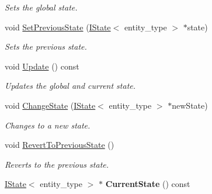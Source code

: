 \begin{DoxyCompactItemize}
\begin{DoxyCompactList}\small\item\em Sets the global state. \end{DoxyCompactList}\item 
\hypertarget{classDCEngine_1_1StateMachine_a5470dc74a0e1430f71854020d97be75c}{void \hyperlink{classDCEngine_1_1StateMachine_a5470dc74a0e1430f71854020d97be75c}{Set\-Previous\-State} (\hyperlink{classDCEngine_1_1IState}{I\-State}$<$ entity\-\_\-type $>$ $\ast$state)}\label{classDCEngine_1_1StateMachine_a5470dc74a0e1430f71854020d97be75c}

\begin{DoxyCompactList}\small\item\em Sets the previous state. \end{DoxyCompactList}\item 
\hypertarget{classDCEngine_1_1StateMachine_abbd522072a86d3a4f2d76f88893d7138}{void \hyperlink{classDCEngine_1_1StateMachine_abbd522072a86d3a4f2d76f88893d7138}{Update} () const }\label{classDCEngine_1_1StateMachine_abbd522072a86d3a4f2d76f88893d7138}

\begin{DoxyCompactList}\small\item\em Updates the global and current state. \end{DoxyCompactList}\item 
void \hyperlink{classDCEngine_1_1StateMachine_ab73e7a9bd5f09f6b6a91eddaad4deb74}{Change\-State} (\hyperlink{classDCEngine_1_1IState}{I\-State}$<$ entity\-\_\-type $>$ $\ast$new\-State)
\begin{DoxyCompactList}\small\item\em Changes to a new state. \end{DoxyCompactList}\item 
\hypertarget{classDCEngine_1_1StateMachine_a5d7c133e380ee786be068543700d52ea}{void \hyperlink{classDCEngine_1_1StateMachine_a5d7c133e380ee786be068543700d52ea}{Revert\-To\-Previous\-State} ()}\label{classDCEngine_1_1StateMachine_a5d7c133e380ee786be068543700d52ea}

\begin{DoxyCompactList}\small\item\em Reverts to the previous state. \end{DoxyCompactList}\item 
\hypertarget{classDCEngine_1_1StateMachine_a878a14d22a23ee871b1c7c4478b949ae}{\hyperlink{classDCEngine_1_1IState}{I\-State}$<$ entity\-\_\-type $>$ $\ast$ {\bfseries Current\-State} () const }\label{classDCEngine_1_1StateMachine_a878a14d22a23ee871b1c7c4478b949ae}


\end{DoxyCompactItemize}
